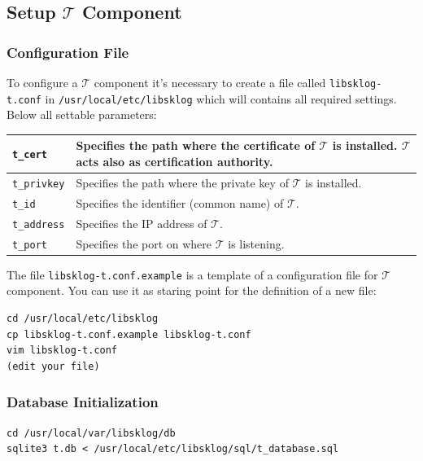 \documentclass[a4paper,12pt]{article}
\def\t{$\mathcal{T}$\xspace}
\begin{document}
\subsection{Setup $\mathcal{T}$ Component}

\subsubsection{Configuration File}

To configure a \t component it's necessary to create a file
called \texttt{libsklog-t.conf} in \texttt{/usr/local/etc/libsklog}
which will contains all required settings. Below all settable parameters:

\begin{center}
\small{
\begin{tabular}{|p{}|p{}|}
\hline
\texttt{t\_cert} & Specifies the path where the certificate of \t is installed.
                   \t acts also as certification authority.\\ \hline
\texttt{t\_privkey} & Specifies the path where the private key of \t is
                      installed. \\ \hline
\texttt{t\_id} & Specifies the identifier (common name) of \t.\\ \hline
\texttt{t\_address} & Specifies the IP address of \t. \\ \hline
\texttt{t\_port} & Specifies the port on where \t is listening.\\ \hline
\end{tabular}
}
\end{center}

The file \texttt{libsklog-t.conf.example} is a template of a
configuration file for \t component. You can use it as staring point
for the definition of a new file:\ \\

\begin{lstlisting}
cd /usr/local/etc/libsklog
cp libsklog-t.conf.example libsklog-t.conf
vim libsklog-t.conf
(edit your file)
\end{lstlisting}

\subsubsection{Database Initialization}

\begin{lstlisting}
cd /usr/local/var/libsklog/db
sqlite3 t.db < /usr/local/etc/libsklog/sql/t_database.sql
\end{lstlisting}
\end{document}
